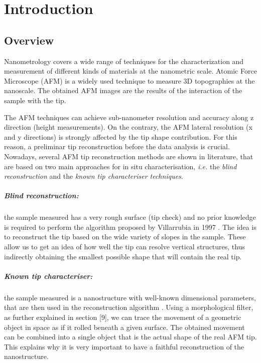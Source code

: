 \chapter{Introduction}

\section{Overview}

Nanometrology covers a wide range of techniques for the characterization and measurement of different kinds of materials at the nanometric scale. Atomic Force Microscope (AFM) is a widely used technique to measure 3D topographies at the nanoscale. The obtained AFM images are the results of the interaction of the sample with the tip.

The AFM techniques can achieve sub-nanometer resolution and accuracy along z direction (height measurements). On the contrary, the AFM lateral resolution (x and y directions) is strongly affected by the tip shape contribution. For this reason, a preliminar tip reconstruction before the data analysis is crucial. Nowadays, several AFM tip reconstruction methods are shown in literature, that are based on two main approaches for in situ characterisation, \textit{i.e.} the \textit{blind reconstruction} and the \textit{known tip characteriser techniques}.

\paragraph{Blind reconstruction:} the sample measured has a very rough surface (tip check) and no prior knowledge is required to perform the algorithm proposed by Villarrubia in 1997 \cite{Villarrubia}. The idea is to reconstruct the tip based on the wide variety of slopes in the sample. These allow us to get an idea of how well the tip can resolve vertical structures, thus indirectly obtaining the smallest possible shape that will contain the real tip.


\paragraph{Known tip characteriser:} the sample measured is a nanostructure with well-known dimensional parameters, that are then used in the reconstruction algorithm \cite{ribotta3}. Using a morphological filter, as further explained in section [9], we can trace the movement of a geometric object in space as if it rolled beneath a given surface. The obtained movement can be combined into a single object that is the actual shape of the real AFM tip. This explains why it is very important to have a faithful reconstruction of the nanostructure.


